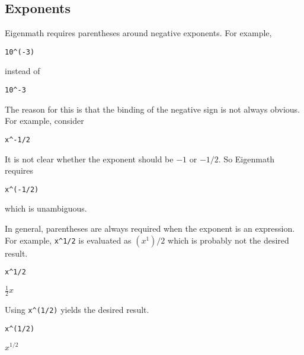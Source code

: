 \subsection{Exponents}

Eigenmath requires parentheses around negative exponents.
For example,

\begin{Verbatim}[formatcom=\color{blue}]
10^(-3)
\end{Verbatim}

\noindent
instead of

\begin{Verbatim}[formatcom=\color{blue}]
10^-3
\end{Verbatim}

\noindent
The reason for this is that the binding of the negative sign is not always
obvious.
For example, consider

\begin{Verbatim}[formatcom=\color{blue}]
x^-1/2
\end{Verbatim}

\noindent
It is not clear whether the exponent should be $-1$ or $-1/2$.
So Eigenmath requires

\begin{Verbatim}[formatcom=\color{blue}]
x^(-1/2)
\end{Verbatim}

\noindent
which is unambiguous.

\bigskip
\noindent
In general, parentheses are always required when the exponent
is an expression.
For example, \verb$x^1/2$ is evaluated as $(x^1)/2$ which
is probably not the desired result.

\begin{Verbatim}[formatcom=\color{blue}]
x^1/2
\end{Verbatim}

\noindent
$\displaystyle \frac{1}{2}x$

\bigskip
\noindent
Using \verb$x^(1/2)$ yields the desired result.

\begin{Verbatim}[formatcom=\color{blue}]
x^(1/2)
\end{Verbatim}

\noindent
$\displaystyle x^{1/2}$
